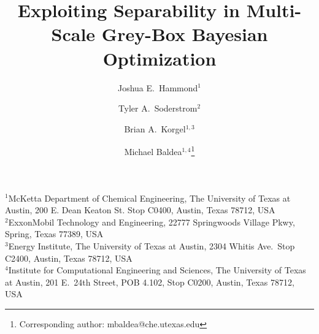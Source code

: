 \documentclass[12pt,a4paper]{article}%
\theoremstyle{plain}%
\theoremstyle{remark}%
\theoremstyle{definition}%
\begin{document}
\title{Exploiting Separability in Multi-Scale Grey-Box Bayesian Optimization}

\author{Joshua E.\ Hammond$^{1}$ \and Tyler A.\ Soderstrom$^{2}$ \and Brian A.\ Korgel$^{1,3}$ \and Michael Baldea$^{1,4}$\thanks{Corresponding author: mbaldea@che.utexas.edu}}

\date{}

\maketitle

\noindent$^{1}$McKetta Department of Chemical Engineering, The University of Texas at Austin, 200 E. Dean Keaton St. Stop C0400, Austin, Texas 78712, USA\\
$^{2}$ExxonMobil Technology and Engineering, 22777 Springwoods Village Pkwy, Spring, Texas 77389, USA\\
$^{3}$Energy Institute, The University of Texas at Austin, 2304 Whitis Ave.\ Stop C2400, Austin, Texas 78712, USA\\
$^{4}$Institute for Computational Engineering and Sciences, The University of Texas at Austin, 201 E.\ 24th Street, POB 4.102, Stop C0200, Austin, Texas 78712, USA

\bigskip
\end{document}
